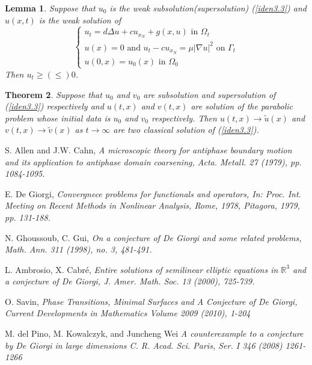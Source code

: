 \documentclass[12pt, a4paper]{article}
\newtheorem{thm}{Theorem}[section]
\newtheorem{lemma}[thm]{Lemma}
\numberwithin{equation}{section}
\newcommand{\R}{\mathbb{R}}
\begin{document}
\begin{CJK}{UTF8}{bkai}
\begin{lemma} 
Suppose that $u_0$ is the weak subsolution(supersolution) (\ref{iden3.3}) and $u(x,t)$ is the weak solution of
\[
\begin{cases}
	u_t=d\Delta u+cu_{x_N}+g(x,u)\mbox{ in }\Omega_t\\
	u(x)=0\mbox{ and } 	u_t-cu_{x_N}=\mu|\nabla u|^2\mbox{ on }\Gamma_t\\
	u(0,x)=u_0(x) \mbox{ in } \Omega_0
\end{cases}
\]
Then $u_t\geq(\leq) 0$.
\end{lemma}

\begin{thm}
	Suppose that $u_0$ and $v_0$ are subsolution and supersolution of (\ref{iden3.3}) respectively and $u(t,x)$ and $v(t,x)$ are solution of the parabolic problem whose initial data is $u_0$ and $v_0$ respectively. Then $u(t,x)\to\tilde{u}(x)$ and $v(t,x)\to\tilde{v}(x)$ as $t\to\infty$ are two classical solution of (\ref{iden3.3}).
\end{thm}
\clearpage












\begin{thebibliography}{99}
	
	 S. Allen and J.W. Cahn, {\it A microscopic theory for antiphase boundary motion and its
application to antiphase domain coarsening, Acta. Metall. 27 (1979), pp. 1084-1095.}

	 E. De Giorgi, {\it Convergnece problems for functionals and operators, In: Proc. Int. Meeting
on Recent Methods in Nonlinear Analysis, Rome, 1978, Pitagora, 1979, pp. 131-188.}

	 N. Ghoussoub, C. Gui, {\it On a conjecture of De Giorgi and some related problems, Math. Ann. 311 (1998), no. 3, 481-491.}

	 L. Ambrosio, X. Cabr\'e, {\it Entire solutions of semilinear elliptic equations in $\R^3$ and a conjecture of De Giorgi, J. Amer. Math. Soc. 13 (2000), 725-739.}

	 O. Savin, {\it Phase Transitions, Minimal Surfaces and A Conjecture of De Giorgi, Current Developments in Mathematics
Volume 2009 (2010), 1-204}

	 M. del Pino, M. Kowalczyk, and Juncheng Wei {\it  A counterexample to a conjecture by De Giorgi in large dimensions C. R. Acad. Sci. Paris, Ser. I 346 (2008) 1261-1266}


\end{thebibliography}
\end{CJK}
\end{document}
